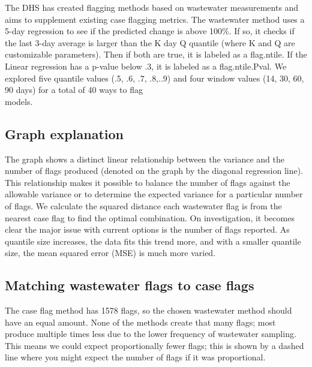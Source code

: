 \documentclass[
]{article}
\begin{document}
The DHS has created flagging methods based on wastewater measurements
and aims to supplement existing case flagging metrics. The wastewater
method uses a 5-day regression to see if the predicted change is above
100\%. If so, it checks if the last 3-day average is larger than the K
day Q quantile (where K and Q are customizable parameters). Then if both
are true, it is labeled as a flag.ntile. If the Linear regression has a
p-value below .3, it is labeled as a flag.ntile.Pval. We explored five
quantile values (.5, .6, .7, .8,..9) and four window values (14, 30, 60,
90 days) for a total of 40 ways to flag\\
models.

\hypertarget{graph-explanation}{%
\subsection{Graph explanation}\label{graph-explanation}}

The graph shows a distinct linear relationship between the variance and
the number of flags produced (denoted on the graph by the diagonal
regression line). This relationship makes it possible to balance the
number of flags against the allowable variance or to determine the
expected variance for a particular number of flags. We calculate the
squared distance each wastewater flag is from the nearest case flag to
find the optimal combination. On investigation, it becomes clear the
major issue with current options is the number of flags reported. As
quantile size increases, the data fits this trend more, and with a
smaller quantile size, the mean squared error (MSE) is much more varied.

\hypertarget{matching-wastewater-flags-to-case-flags}{%
\subsection{Matching wastewater flags to case
flags}\label{matching-wastewater-flags-to-case-flags}}

The case flag method has 1578 flags, so the chosen wastewater method
should have an equal amount. None of the methods create that many flags;
most produce multiple times less due to the lower frequency of
wastewater sampling. This means we could expect proportionally fewer
flags; this is shown by a dashed line where you might expect the number
of flags if it was proportional.
\end{document}
